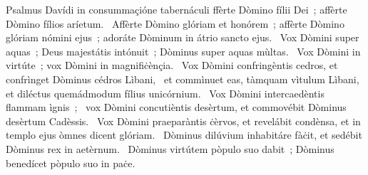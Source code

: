 { Psalmus Davídi in consummaçióne tabernáculi}
{%
ffèrte Dòmino fílii Dei~; affèrte Dòmino fílios aríetum. 
~Affèrte Dòmino glóriam et honórem~; affèrte Dòmino glóriam nómini ejus~; adoráte Dòminum in átrio sancto ejus. 
~Vox Dòmini super aquas~; Deus majestátis intónuit~; Dòminus super aquas mùltas. 
~Vox Dòmini in virtúte~; vox Dòmini in magnifiċènçia. 
~Vox Dòmini confringèntis cedros, et confrìnget Dòminus cédros Lìbani, 
~et commìnuet eas, tàmquam vìtulum Lìbani, et diléctus quemádmodum fílius unicórnium. 
~Vox Dòmini intercaedèntis flammam ìgnis~; 
~vox Dòmini concutièntis desèrtum, et commovébit Dòminus desèrtum Cadèssis. 
~Vox Dòmini praeparàntis ċèrvos, et revelábit condènsa, et in templo ejus òmnes dicent glóriam. 
~Dòminus dilúvium inhabitáre fàċit, et sedébit Dòminus rex in aetèrnum. 
~Dòminus virtútem pòpulo suo dabit~; Dòminus benedícet pòpulo suo in paċe. 
}
